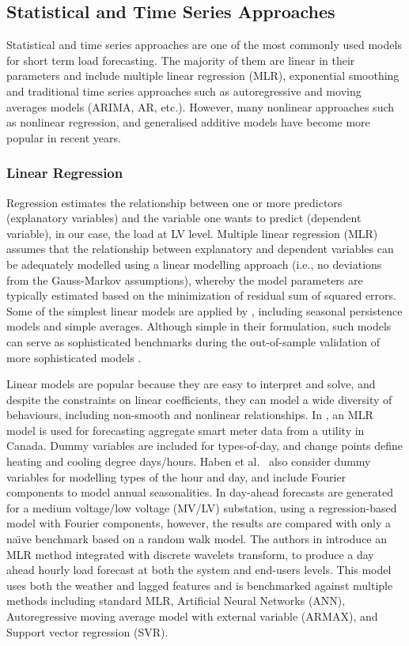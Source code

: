\subsection{Statistical and Time Series Approaches}  
\label{secStatandTS}
Statistical and time series approaches are one of the most commonly used models for short term load forecasting. The majority of them are linear in their parameters and include multiple linear regression (MLR), exponential smoothing and traditional time series approaches such as autoregressive and moving averages models (ARIMA, AR, etc.). However, many nonlinear approaches such as nonlinear regression, and generalised additive models have become more popular in recent years. 

\subsubsection{Linear Regression}
Regression estimates the relationship between one or more predictors (explanatory variables)  and the variable one wants to predict (dependent variable), in our case, the load at LV level. Multiple linear regression (MLR) assumes that the relationship between explanatory and dependent variables can be adequately modelled using a linear modelling approach (i.e., no deviations from the Gauss-Markov assumptions), whereby the model parameters are typically estimated based on the minimization of residual sum of squared errors. Some of the simplest linear models are applied by \cite{Litjens2018aof}, including seasonal persistence models and simple averages. Although simple in their formulation, such models can serve as sophisticated benchmarks during the out-of-sample validation of more sophisticated models \cite{Haben2019stl}.

Linear models are popular because they are easy to interpret and solve, and despite the constraints on linear coefficients, they can model a wide diversity of behaviours, including non-smooth and nonlinear relationships. In \cite{macmackin2019mad}, an MLR model is used for forecasting aggregate smart meter data from a utility in Canada. Dummy variables are included for types-of-day, and change points define heating and cooling degree days/hours. Haben et al.~\cite{Haben2019stl} also consider dummy variables for modelling types of the hour and day, and include Fourier components to model annual seasonalities. In \cite{Ding2015nms}  day-ahead forecasts are generated for a medium voltage/low voltage (MV/LV) substation, using a regression-based model with Fourier components, however, the results are compared with only a na\"{\i}ve benchmark based on a random walk model. The authors in \cite{aprillia2019oda} introduce an MLR method integrated with discrete wavelets transform, to produce a day ahead hourly load forecast at both the system and end-users levels. This model uses both the weather and lagged features and is benchmarked against multiple methods including standard MLR, Artificial Neural Networks (ANN), Autoregressive moving average model with external variable (ARMAX), and Support vector regression (SVR). 

